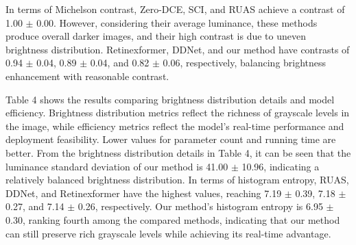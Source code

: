 \documentclass[sensors,article,submit,moreauthors]{Definitions/mdpi}
\begin{document}
In terms of Michelson contrast, Zero-DCE, SCI, and RUAS achieve a contrast of 1.00 $\pm$ 0.00. However, considering their average luminance, these methods produce overall darker images, and their high contrast is due to uneven brightness distribution. Retinexformer, DDNet, and our method have contrasts of 0.94 $\pm$ 0.04, 0.89 $\pm$ 0.04, and 0.82 $\pm$ 0.06, respectively, balancing brightness enhancement with reasonable contrast.

Table 4 shows the results comparing brightness distribution details and model efficiency. Brightness distribution metrics reflect the richness of grayscale levels in the image, while efficiency metrics reflect the model's real-time performance and deployment feasibility. Lower values for parameter count and running time are better. From the brightness distribution details in Table 4, it can be seen that the luminance standard deviation of our method is 41.00 $\pm$ 10.96, indicating a relatively balanced brightness distribution. In terms of histogram entropy, RUAS, DDNet, and Retinexformer have the highest values, reaching 7.19 $\pm$ 0.39, 7.18 $\pm$ 0.27, and 7.14 $\pm$ 0.26, respectively. Our method's histogram entropy is 6.95 $\pm$ 0.30, ranking fourth among the compared methods, indicating that our method can still preserve rich grayscale levels while achieving its real-time advantage.
\end{document}
